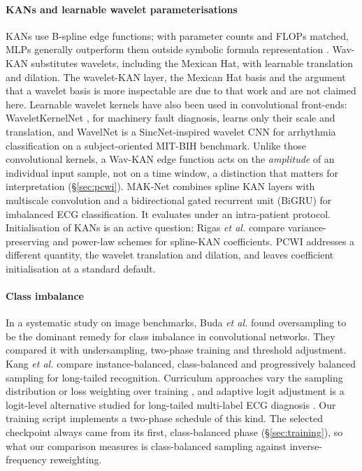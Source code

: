 \documentclass[preprint,12pt]{elsarticle}
\begin{document}
\paragraph{KANs and learnable wavelet parameterisations} KANs \cite{liu_kan_2024} use B-spline edge functions; with parameter counts and FLOPs matched, MLPs generally outperform them outside symbolic formula representation \cite{yu_kan_2024}. Wav-KAN \cite{bozorgasl_wavkan_2024} substitutes wavelets, including the Mexican Hat, with learnable translation and dilation. The wavelet-KAN layer, the Mexican Hat basis and the argument that a wavelet basis is more inspectable are due to that work and are not claimed here. Learnable wavelet kernels have also been used in convolutional front-ends: WaveletKernelNet \cite{li_waveletkernelnet_2022}, for machinery fault diagnosis, learns only their scale and translation, and WavelNet \cite{kim_wavelnet_2023} is a SincNet-inspired wavelet CNN for arrhythmia classification on a subject-oriented MIT-BIH benchmark. Unlike those convolutional kernels, a Wav-KAN edge function acts on the \emph{amplitude} of an individual input sample, not on a time window, a distinction that matters for interpretation (\S\ref{sec:pcwi}). MAK-Net \cite{zhao_mak-net_2025} combines spline KAN layers with multiscale convolution and a bidirectional gated recurrent unit (BiGRU) for imbalanced ECG classification. It evaluates under an intra-patient protocol. Initialisation of KANs is an active question: Rigas \emph{et al.} \cite{rigas_initialization_2025} compare variance-preserving and power-law schemes for spline-KAN coefficients. PCWI addresses a different quantity, the wavelet translation and dilation, and leaves coefficient initialisation at a standard default.

\paragraph{Class imbalance} In a systematic study on image benchmarks, Buda \emph{et al.} \cite{buda_systematic_2018} found oversampling to be the dominant remedy for class imbalance in convolutional networks. They compared it with undersampling, two-phase training and threshold adjustment. Kang \emph{et al.} \cite{kang_decoupling_2020} compare instance-balanced, class-balanced and progressively balanced sampling for long-tailed recognition. Curriculum approaches vary the sampling distribution or loss weighting over training \cite{bengio_curriculum_2009, bae_handling_2025, schmale_curriculum_2025}, and adaptive logit adjustment is a logit-level alternative studied for long-tailed multi-label ECG diagnosis \cite{dai_angular_2026}. Our training script implements a two-phase schedule of this kind. The selected checkpoint always came from its first, class-balanced phase (\S\ref{sec:training}), so what our comparison measures is class-balanced sampling against inverse-frequency reweighting.
\end{document}
